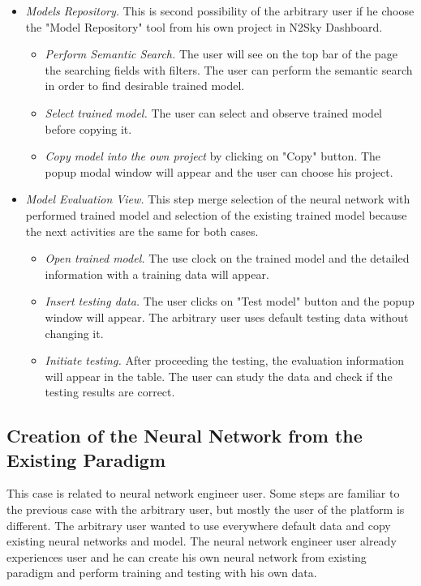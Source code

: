 \begin{itemize}
\item \emph{Models Repository.} This is second possibility of the arbitrary user if he choose the "Model Repository" tool from his own project in N2Sky Dashboard.
\begin{itemize}
\item \emph{Perform Semantic Search.} The user will see on the top bar of the page the searching fields with filters. The user can perform the semantic search in order to find desirable trained model.
\item \emph{Select trained model.} The user can select and observe trained model before copying it.
\item \emph{Copy model into the own project} by clicking on "Copy" button. The popup modal window will appear and the user can choose his project.
\end{itemize}

\item \emph{Model Evaluation View.} This step merge selection of the neural network with performed trained model and selection of the existing trained model because the next activities are the same for both cases.
\begin{itemize}
\item \emph{Open trained model.} The use clock on the trained model and the detailed information with a training data will appear.
\item \emph{Insert testing data.} The user clicks on "Test model" button and the popup window will appear. The arbitrary user uses default testing data without changing it.
\item \emph{Initiate testing.} After proceeding the testing, the evaluation information will appear in the table. The user can study the data and check if the testing results are correct.
\end{itemize}


\end{itemize}



\subsection{Creation of the Neural Network from the Existing Paradigm}\label{Creation of the neural network from the existing paradigm}

This case is related to neural network engineer user. Some steps are familiar to the previous case with the arbitrary user, but mostly the user of the platform is different. The arbitrary user wanted to use everywhere default data and copy existing neural networks and model. The neural network engineer user already experiences user and he can create his own neural network from existing paradigm and perform training and testing with his own data.


